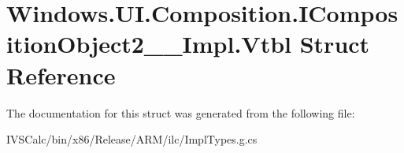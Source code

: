\hypertarget{struct_windows_1_1_u_i_1_1_composition_1_1_i_composition_object2_____impl_1_1_vtbl}{}\section{Windows.\+U\+I.\+Composition.\+I\+Composition\+Object2\+\_\+\+\_\+\+Impl.\+Vtbl Struct Reference}
\label{struct_windows_1_1_u_i_1_1_composition_1_1_i_composition_object2_____impl_1_1_vtbl}


The documentation for this struct was generated from the following file\+:\begin{DoxyCompactItemize}
\item 
I\+V\+S\+Calc/bin/x86/\+Release/\+A\+R\+M/ilc/Impl\+Types.\+g.\+cs\end{DoxyCompactItemize}
